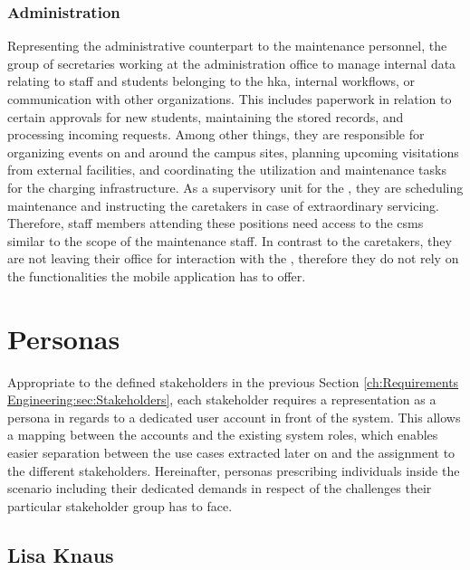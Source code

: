 \subsubsection{Administration}
\label{ch:Requirements Engineering:sec:Stakeholders:ssec:Staff:sssec:Administration}

Representing the administrative counterpart to the maintenance personnel, the group of secretaries working at the administration office to manage internal data relating to staff and students belonging to the \acrshort{hka}, internal workflows, or communication with other organizations. 
This includes paperwork in relation to certain approvals for new students, maintaining the stored records, and processing incoming requests. Among other things, they are responsible for organizing events on and around the campus sites, planning upcoming visitations from external facilities, and coordinating the utilization and maintenance tasks for the charging infrastructure.
As a supervisory unit for the , they are scheduling maintenance and instructing the caretakers in case of extraordinary servicing.  
Therefore, staff members attending these positions need access to the \acrshort{csms} similar to the scope of the maintenance staff. In contrast to the caretakers, they are not leaving their office for interaction with the , therefore they do not rely on the functionalities the mobile application has to offer.

\section{Personas}
\label{ch:Requirements Engineering:sec:Personas}

Appropriate to the defined stakeholders in the previous Section \ref{ch:Requirements Engineering:sec:Stakeholders}, each stakeholder requires a representation as a persona in regards to a dedicated user account in front of the system.
This allows a mapping between the accounts and the existing system roles, which enables easier separation between the use cases extracted later on and the assignment to the different stakeholders. 
Hereinafter, personas prescribing individuals inside the scenario including their dedicated demands in respect of the challenges their particular stakeholder group has to face. 

\subsection{Lisa Knaus}
\label{ch:Requirements Engineering:sec:Personas:ssec:Lisa Knaus}

